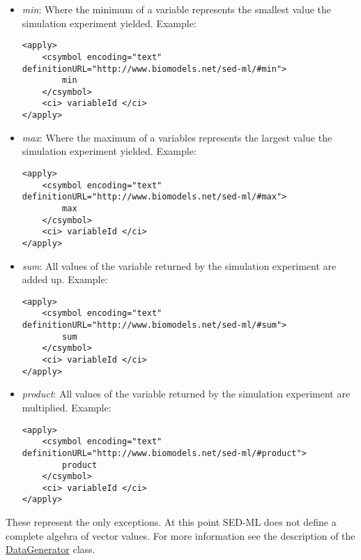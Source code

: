 \begin{itemize}\setlength{\parskip}{-0.1ex}

\item \emph{min}: Where the minimum of a variable represents the smallest value 
the simulation experiment yielded. Example: 
%
\begin{verbatim} 
<apply>
 	<csymbol encoding="text" definitionURL="http://www.biomodels.net/sed-ml/#min">
 		min
 	</csymbol>
 	<ci> variableId </ci>
</apply>
\end{verbatim}

\item \emph{max}: Where the maximum of a variables represents the largest value 
the simulation experiment yielded. Example: 
%
\begin{verbatim} 
<apply>
 	<csymbol encoding="text" definitionURL="http://www.biomodels.net/sed-ml/#max">
 		max
 	</csymbol>
 	<ci> variableId </ci>
</apply>
\end{verbatim}

\item \emph{sum}: All values of the variable returned by the simulation 
experiment are added up. Example: 
%
\begin{verbatim} 
<apply>
 	<csymbol encoding="text" definitionURL="http://www.biomodels.net/sed-ml/#sum">
 		sum
 	</csymbol>
 	<ci> variableId </ci>
</apply>
\end{verbatim}


\item \emph{product}: All values of the variable returned by the simulation 
experiment are multiplied. Example: 
%
\begin{verbatim} 
<apply>
 	<csymbol encoding="text" definitionURL="http://www.biomodels.net/sed-ml/#product">
 		product
 	</csymbol>
 	<ci> variableId </ci>
</apply>
\end{verbatim}

\end{itemize}

These represent the only exceptions. At this point SED-ML does not define a complete algebra of vector values. For more information see the description of the \hyperref[class:dataGenerator]{DataGenerator} class.


